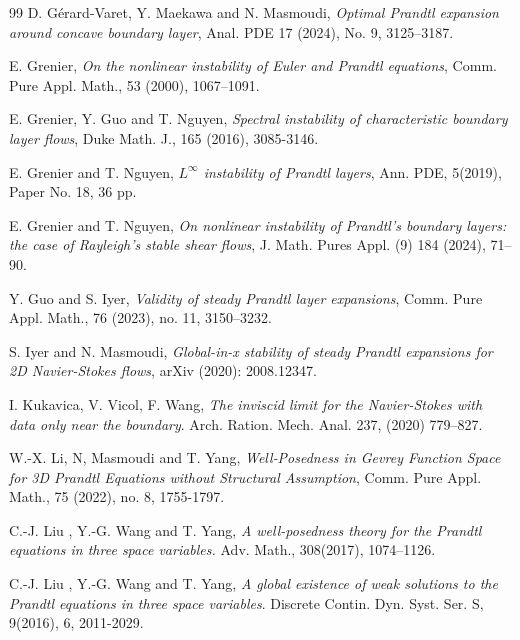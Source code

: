 \documentclass[reqno,11pt]{amsart}
\numberwithin{equation}{section}
\numberwithin{equation}{section}
\theoremstyle{plain}
\begin{document}
\begin{thebibliography}{99}
 D. G\'erard-Varet, Y. Maekawa and N. Masmoudi,  {\it Optimal Prandtl expansion around concave boundary layer}, Anal. PDE 17 (2024), No. 9, 3125--3187.




 E. Grenier, {\it  On the nonlinear instability of Euler and Prandtl equations}, Comm. Pure Appl. Math., 53 (2000), 1067–1091.

  E. Grenier, Y. Guo and T. Nguyen,  {\it Spectral instability of characteristic boundary layer flows}, Duke Math. J., 165 (2016),  3085-3146.

  E. Grenier and T.  Nguyen, {\it $L^\infty$ instability of Prandtl layers},  Ann. PDE,  5(2019), Paper No. 18, 36 pp.

 E. Grenier and T. Nguyen, {\it  On nonlinear instability of Prandtl’s boundary layers: the case of Rayleigh’s stable
	shear flows}, J. Math. Pures Appl. (9) 184 (2024), 71--90.

 Y. Guo and S. Iyer, {\it  Validity of steady Prandtl layer expansions}, Comm. Pure Appl. Math., 76 (2023),  no. 11, 3150--3232.

 S. Iyer and N. Masmoudi, {\it  Global-in-x stability of steady Prandtl expansions for 2D Navier-Stokes flows}, arXiv (2020): 2008.12347.    

 I. Kukavica, V. Vicol, F. Wang, {\it The inviscid limit for the Navier-Stokes with data only near the boundary}. Arch. Ration. Mech. Anal. 237, (2020) 779--827.


 W.-X. Li, N, Masmoudi and T. Yang, {\it  Well‐Posedness in Gevrey Function Space for 3D Prandtl Equations without Structural Assumption}, Comm. Pure Appl. Math., 75 (2022),  no. 8, 1755-1797.



C.-J. Liu , Y.-G. Wang and T. Yang, {\it A well-posedness theory for the Prandtl equations in three space variables.} Adv. Math., 308(2017), 1074–1126.

C.-J. Liu , Y.-G. Wang and T. Yang, {\it A global existence of weak solutions to the Prandtl equations in three space variables}. Discrete Contin. Dyn. Syst. Ser. S, 9(2016), 6, 2011-2029.


\end{thebibliography}
\end{document}
